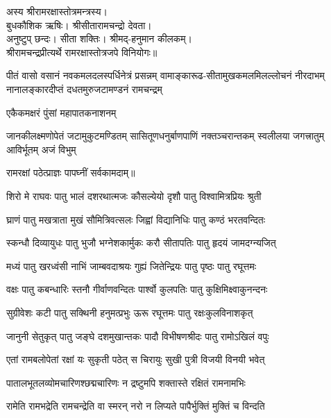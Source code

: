 
अस्य श्रीरामरक्षास्तोत्रमन्त्रस्य।\\
बुधकौशिक ऋषिः। श्रीसीतारामचन्द्रो देवता।\\
अनुष्टुप् छन्दः। सीता शक्तिः। श्रीमद्-हनुमान कीलकम्।\\
श्रीरामचन्द्रप्रीत्यर्थे रामरक्षास्तोत्रजपे विनियोगः॥

{पीतं वासो वसानं नवकमलदलस्पर्धिनेत्रं प्रसन्नम्}
{वामाङ्कारूढ-सीतामुखकमलमिलल्लोचनं नीरदाभम्}
{नानालङ्कारदीप्तं दधतमुरुजटामण्डनं रामचन्द्रम्}

{एकैकमक्षरं पुंसां महापातकनाशनम्}

{जानकीलक्ष्मणोपेतं जटामुकुटमण्डितम्}
{सासितूणधनुर्बाणपाणिं नक्तञ्चरान्तकम्}
{स्वलीलया जगत्त्रातुम् आविर्भूतम् अजं विभुम्}

{रामरक्षां पठेत्प्राज्ञः पापघ्नीं सर्वकामदाम्॥}

\resetShloka

\twolineshloka
{शिरो मे राघवः पातु भालं दशरथात्मजः}
{कौसल्येयो दृशौ पातु विश्वामित्रप्रियः श्रुती}

\twolineshloka
{घ्राणं पातु मखत्राता मुखं सौमित्रिवत्सलः}
{जिह्वां विद्यानिधिः पातु कण्ठं भरतवन्दितः}

\twolineshloka
{स्कन्धौ दिव्यायुधः पातु भुजौ भग्नेशकार्मुकः}
{करौ सीतापतिः पातु हृदयं जामदग्न्यजित्}

\twolineshloka
{मध्यं पातु खरध्वंसी नाभिं जाम्बवदाश्रयः}
{गुह्यं जितेन्द्रियः पातु पृष्ठः पातु रघूत्तमः}

\twolineshloka
{वक्षः पातु कबन्धारिः स्तनौ गीर्वाणवन्दितः}
{पार्श्वो कुलपतिः पातु कुक्षिमिक्ष्वाकुनन्दनः}

\twolineshloka
{सुग्रीवेशः कटी पातु सक्थिनी हनुमत्प्रभुः}
{ऊरू रघूत्तमः पातु रक्षःकुलविनाशकृत्}

\twolineshloka
{जानुनी सेतुकृत् पातु जङ्घे दशमुखान्तकः}
{पादौ विभीषणश्रीदः पातु रामोऽखिलं वपुः}

\twolineshloka
{एतां रामबलोपेतां रक्षां यः सुकृती पठेत्}
{स चिरायुः सुखी पुत्री विजयी विनयी भवेत्}

\twolineshloka
{पातालभूतलव्योमचारिणश्छद्मचारिणः}
{न द्रष्टुमपि शक्तास्ते रक्षितं रामनामभिः}

\twolineshloka
{रामेति रामभद्रेति रामचन्द्रेति वा स्मरन्}
{नरो न लिप्यते पापैर्भुक्तिं मुक्तिं च विन्दति}

